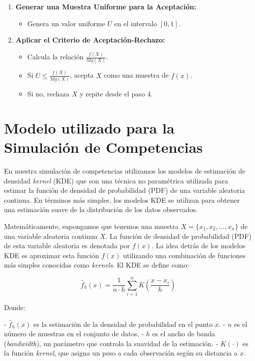 \documentclass[12pt]{article}
\begin{document}
\begin{enumerate}
    \item \textbf{Generar una Muestra Uniforme para la Aceptación:}
    \begin{itemize}
        \item Genera un valor uniforme \( U \) en el intervalo \([0, 1]\).
    \end{itemize}

    \item \textbf{Aplicar el Criterio de Aceptación-Rechazo:}
    \begin{itemize}
        \item Calcula la relación \( \frac{f(X)}{M g(X)} \).
        \item Si \( U \leq \frac{f(X)}{M g(X)} \), acepta \( X \) como una muestra de \( f(x) \).
        \item Si no, rechaza \( X \) y repite desde el paso 4.
    \end{itemize}

\end{enumerate}


\section*{Modelo utilizado para la Simulación de Competencias}

En nuestra simulación de competencias utilizamos los modelos de estimación de densidad \textit{kernel} (KDE) que son una técnica no paramétrica utilizada para estimar la función de densidad de probabilidad (PDF) de una variable aleatoria continua. En términos más simples, los modelos KDE se utilizan para obtener una estimación suave de la distribución de los datos observados.

Matemáticamente, supongamos que tenemos una muestra \( X = \{x_1, x_2, \ldots, x_n\} \) de una variable aleatoria continua \( X \). La función de densidad de probabilidad (PDF) de esta variable aleatoria es denotada por \( f(x) \). La idea detrás de los modelos KDE es aproximar esta función \( f(x) \) utilizando una combinación de funciones más simples conocidas como \textit{kernels}. El KDE se define como:

\[ \hat{f}_h(x) = \frac{1}{n \cdot h} \sum_{i=1}^{n} K\left(\frac{x - x_i}{h}\right) \]

Donde:

- \( \hat{f}_h(x) \) es la estimación de la densidad de probabilidad en el punto \( x \).
- \( n \) es el número de muestras en el conjunto de datos.
- \( h \) es el ancho de banda (\textit{bandwidth}), un parámetro que controla la suavidad de la estimación.
- \( K(\cdot) \) es la función \textit{kernel}, que asigna un peso a cada observación según su distancia a \( x \).
\end{document}
